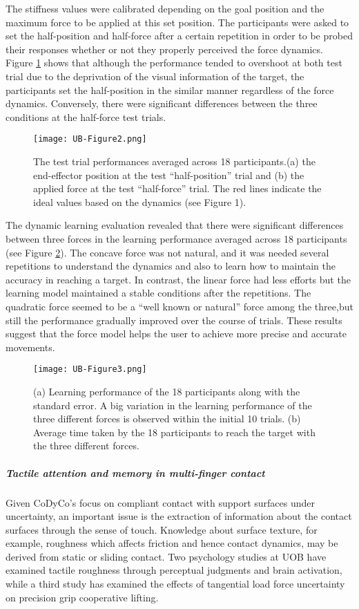 The stiffness values were calibrated depending on the goal position and the maximum force to be applied at this set position. The participants were asked to set the half-position and half-force after a certain repetition in order to be probed their responses whether or not they properly perceived the force dynamics. Figure \ref{fig:testrial} shows that although the performance tended to overshoot at both test trial due to the deprivation of the visual information of the target, the participants set the half-position in the similar manner regardless of the force dynamics. Conversely, there were significant differences between the three conditions at the half-force test trials.

\begin{figure} 
	\centering
	\texttt{[image: UB-Figure2.png]}
	\caption{The test trial performances averaged across 18 participants.(a) the end-effector position at the test “half-position” trial and (b) the applied force at the test “half-force” trial. The red lines indicate the ideal values based on the dynamics (see Figure 1).}
	\label{fig:testrial}
\end{figure}

\bigbreak
\bigbreak
The dynamic learning evaluation revealed that there were significant differences between three forces in the learning performance averaged across 18 participants (see Figure \ref{fig:learnerror}). The concave force was not natural, and it was needed several repetitions to understand the dynamics and also to learn how to maintain the accuracy in reaching a target. In contrast, the linear force had less efforts but the learning model maintained a stable conditions after the repetitions. The quadratic force seemed to be a “well known or natural” force among the three,but still the performance gradually improved over the course of trials. These results suggest that the force model helps the user to achieve more precise and accurate movements.

\begin{figure} 
	\centering
	\texttt{[image: UB-Figure3.png]}
	\caption{(a) Learning performance of the 18 participants along with the standard error. A big variation in the learning performance of the three different forces is observed within the initial 10 trials. 
		(b) Average time taken by the 18 participants to reach the target with the three different forces.}
	\label{fig:learnerror}
\end{figure}

\subparagraph*{Tactile attention and memory in multi-finger contact}
Given CoDyCo’s focus on compliant contact with support surfaces under uncertainty, an important issue is the extraction of information about the contact surfaces through the sense of touch. Knowledge about surface texture, for example, roughness which affects friction and hence contact dynamics, may be derived from static or sliding contact. Two psychology studies at UOB have examined tactile roughness through perceptual judgments and brain activation, while a third study has examined the effects of tangential load force uncertainty on precision grip cooperative lifting.

